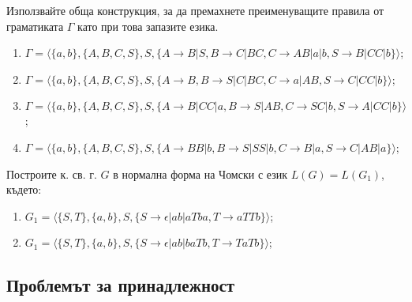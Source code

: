 \begin{problem}
Използвайте обща конструкция, за да премахнете преименуващите правила от граматиката $\Gamma$ като при това запазите езика.

\begin{enumerate}
\item
$\Gamma=\langle\{a,b\},\{A,B,C,S\},S,\{A\rightarrow B|S,B\rightarrow C|BC,C\rightarrow AB|a|b,S\rightarrow B|CC|b\}\rangle$;
\item
$\Gamma=\langle\{a,b\},\{A,B,C,S\},S,\{A\rightarrow B,B\rightarrow S|C|BC,C\rightarrow a|AB,S\rightarrow C|CC|b\}\rangle$;
\item
$\Gamma=\langle\{a,b\},\{A,B,C,S\},S,\{A\rightarrow B|CC|a,B\rightarrow S|AB,C\rightarrow SC|b,S\rightarrow A|CC|b\}\rangle$;
\item
$\Gamma=\langle\{a,b\},\{A,B,C,S\},S,\{A\rightarrow BB|b,B\rightarrow S|SS|b,C\rightarrow B|a,S\rightarrow C|AB|a\}\rangle$;
\end{enumerate}
\end{problem}

\begin{problem}
Построите к. св. г. $G$ в нормална форма на Чомски с език $L(G) = L(G_1)$, където:
\begin{enumerate}
\item
$G_1=\langle\{S,T\},\{a,b\},S,\{S \rightarrow \epsilon|ab|aTba,T\rightarrow aTTb\}\rangle$;
\item
$G_1=\langle\{S,T\},\{a,b\},S,\{S \rightarrow \epsilon|ab|baTb,T\rightarrow TaTb\}\rangle$;
\end{enumerate}
\end{problem}


\subsection{Проблемът за принадлежност}

